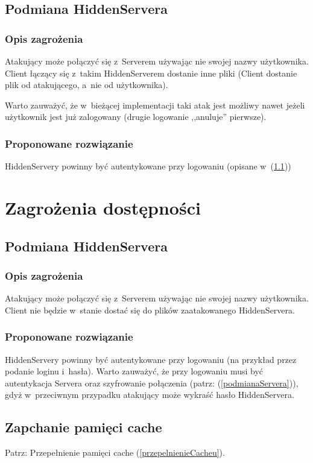 \documentclass[a4paper,notitlepage]{article}
\begin{document}
\subsection{Podmiana HiddenServera}
\subsubsection*{Opis zagrożenia}
Atakujący może połączyć się z~Serverem używając nie swojej nazwy użytkownika.
Client łączący się z~takim HiddenServerem dostanie inne pliki 
(Client dostanie plik od atakującego, a~nie od użytkownika).

Warto zauważyć, że w~bieżącej implementacji taki atak jest możliwy nawet
jeżeli użytkownik jest już zalogowany (drugie logowanie ,,anuluje'' pierwsze).
\subsubsection*{Proponowane rozwiązanie}
HiddenServery powinny być autentykowane przy logowaniu 
(opisane w~(\ref{podmianaHiddenServera}))

\section{Zagrożenia dostępności}
\subsection{Podmiana HiddenServera}
\label{podmianaHiddenServera}
\subsubsection*{Opis zagrożenia}
Atakujący może połączyć się z~Serverem używając nie swojej nazwy użytkownika.
Client nie będzie w~stanie dostać się do plików zaatakowanego HiddenServera.

\subsubsection*{Proponowane rozwiązanie}
HiddenServery powinny być autentykowane przy logowaniu (na przykład przez
podanie loginu i~hasła). Warto zauważyć, że przy logowaniu musi być
autentykacja Servera oraz szyfrowanie połączenia 
(patrz: (\ref{podmianaServera})), gdyż w~przeciwnym
przypadku atakujący może wykraść hasło HiddenServera.

\subsection{Zapchanie pamięci cache}
Patrz: Przepełnienie pamięci cache (\ref{przepelnienieCacheu}). 
\end{document}
